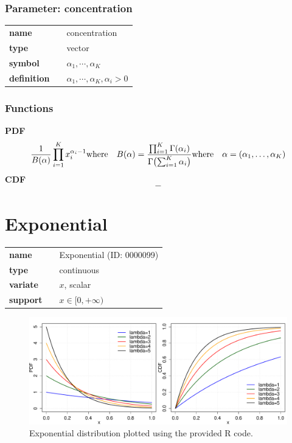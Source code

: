 \documentclass{article}
\begin{document}
\subsubsection*{Parameter: concentration}

\noindent\begin{tabular}{p{2cm}cl}
\textbf{name} & & concentration \\
\textbf{type} & & vector \\
\textbf{symbol} & & $\alpha_1, \cdots, \alpha_K$  \\
\textbf{definition} & & $\alpha_1, \cdots, \alpha_K, \alpha_i > 0$
\end{tabular}
\subsubsection*{Functions}

\smallskip \noindent \hspace{.2cm} \textbf{PDF} 
\begin{equation*}\frac{1}{B(\alpha)} \prod_{i=1}^K x_i^{\alpha_i - 1} \\ \text{where} \quad B(\alpha) = \frac{\prod_{i=1}^K \Gamma(\alpha_i)}{\Gamma\bigl(\sum_{i=1}^K \alpha_i\bigr)} \\ \text{where} \quad \alpha=(\alpha_1,\ldots,\alpha_K)\end{equation*}
\smallskip \noindent \hspace{.2cm} \textbf{CDF} 
\begin{equation*}-\end{equation*}
\smallskip\section*{Exponential} 

  \bigskip 

\begin{tabular}{p{2cm}cl}
\textbf{name} & & Exponential (ID: 0000099)\\ 
 
\textbf{type} & & continuous \\ 

\textbf{variate} & & $x$, scalar \\ 

\textbf{support} & & $x \in [0,+\infty)$
\end{tabular}

\begin{figure}[ht!]
\centering
  \includegraphics[width=140mm]{pics/Exponential.pdf}
 \caption{Exponential distribution plotted using the provided R code.}
 \label{fig:Exponential}
\end{figure}
\end{document}
